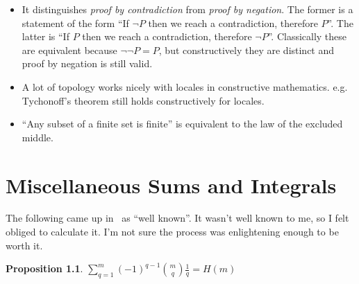 \documentclass[a4paper]{book}
\newtheorem{proposition}{Proposition}
\begin{document}
\begin{itemize}
\item It distinguishes \emph{proof by contradiction} from \emph{proof by negation}.
The former is a statement of the form ``If \(\lnot P\) then we reach a contradiction, therefore \(P\)''.
The latter is ``If \(P\) then we reach a contradiction, therefore \(\lnot P\)''.
Classically these are equivalent because \(\lnot \lnot P = P\),
but constructively they are distinct and proof by negation is still valid.
\item A lot of topology works nicely with locales in constructive mathematics.
e.g. Tychonoff's theorem still holds constructively for locales.
\item ``Any subset of a finite set is finite'' is equivalent to the law of the excluded middle.
\end{itemize}


\chapter{Miscellaneous Sums and Integrals}

The following came up in~\cite{DBLP:journals/dam/FlajoletGT92} as ``well known''.
It wasn't well known to me,
so I felt obliged to calculate it.
I'm not sure the process was enlightening enough to be worth it.

\begin{proposition}
\(\sum\limits_{q = 1}^m {(-1)}^{q - 1} {m \choose q} \frac{1}{q} = H(m)\)
\end{proposition}
\end{document}
